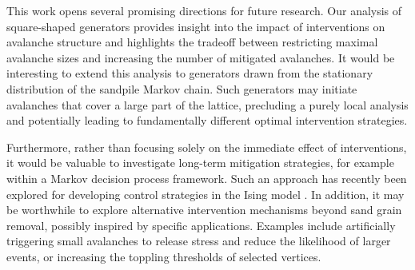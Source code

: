 \documentclass{article}
\begin{document}
This work opens several promising directions for future research. Our analysis of square-shaped generators provides insight into the impact of interventions on avalanche structure and highlights the tradeoff between restricting maximal avalanche sizes and increasing the number of mitigated avalanches. It would be interesting to extend this analysis to generators drawn from the stationary distribution of the sandpile Markov chain. Such generators may initiate avalanches that cover a large part of the lattice, precluding a purely local analysis and potentially leading to fundamentally different optimal intervention strategies. 

Furthermore, rather than focusing solely on the immediate effect of interventions, it would be valuable to investigate long-term mitigation strategies, for example within a Markov decision process framework. Such an approach has recently been explored for developing control strategies in the Ising model \citep{deJongh1, deJongh2}. In addition, it may be worthwhile to explore alternative intervention mechanisms beyond sand grain removal, possibly inspired by specific applications. Examples include artificially triggering small avalanches to release stress and reduce the likelihood of larger events, or increasing the toppling thresholds of selected vertices.



%







\end{document}
